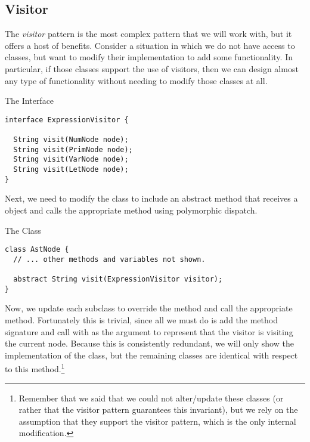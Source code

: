 \subsection*{Visitor}

The \textit{visitor} pattern is the most complex pattern that we will work with, but it offers a host of benefits. Consider a situation in which we do not have access to classes, but want to modify their implementation to add some functionality. In particular, if those classes support the use of visitors, then we can design almost any type of functionality without needing to modify those classes at all.


\begin{cl}[]{The  Interface}
\begin{lstlisting}[language=MyJava]
interface ExpressionVisitor {
  
  String visit(NumNode node);
  String visit(PrimNode node);
  String visit(VarNode node);
  String visit(LetNode node);
}
\end{lstlisting}
\end{cl}

Next, we need to modify the  class to include an abstract  method that receives a  object and calls the appropriate  method using polymorphic dispatch. 

\begin{cl}[]{The  Class}
\begin{lstlisting}[language=MyJava]
class AstNode {
  // ... other methods and variables not shown.

  abstract String visit(ExpressionVisitor visitor);
}
\end{lstlisting}
\end{cl}

Now, we update each subclass to override the  method and call the appropriate  method. Fortunately this is trivial, since all we must do is add the method signature and call  with  as the argument to represent that the visitor is visiting the current node. Because this is consistently redundant, we will only show the implementation of the  class, but the remaining classes are identical with respect to this method.\footnote{Remember that we said that we could not alter/update these classes (or rather that the visitor pattern guarantees this invariant), but we rely on the assumption that they support the visitor pattern, which is the only internal modification.}

